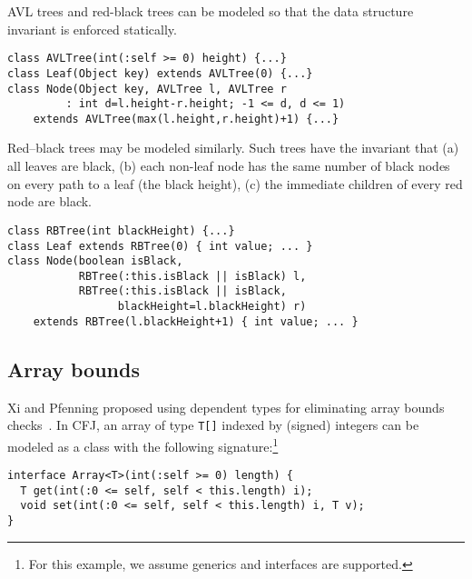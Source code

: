 AVL trees and red-black trees can be modeled so that the
data structure invariant is enforced statically.

{\footnotesize
\begin{verbatim}
class AVLTree(int(:self >= 0) height) {...}
class Leaf(Object key) extends AVLTree(0) {...}
class Node(Object key, AVLTree l, AVLTree r
         : int d=l.height-r.height; -1 <= d, d <= 1) 
    extends AVLTree(max(l.height,r.height)+1) {...}
\end{verbatim}}

Red--black trees may be modeled similarly. Such trees have the
invariant that (a) all leaves are black, (b) each non-leaf node has
the same number of black nodes on every path to a leaf (the black
height), (c) the immediate children of every red node are black.
{\footnotesize
\begin{verbatim}
class RBTree(int blackHeight) {...}
class Leaf extends RBTree(0) { int value; ... }
class Node(boolean isBlack, 
           RBTree(:this.isBlack || isBlack) l, 
           RBTree(:this.isBlack || isBlack,
                 blackHeight=l.blackHeight) r)
    extends RBTree(l.blackHeight+1) { int value; ... }
\end{verbatim}}


\subsection{Array bounds}

Xi and Pfenning proposed using dependent types for eliminating
array bounds checks~\cite{xi98array}.
In CFJ, an array of type {\tt T[]} indexed by (signed) integers
can be modeled as a class with the following
signature:\footnote{For this example, we assume generics and
interfaces are supported.}
{\footnotesize
\begin{verbatim}
interface Array<T>(int(:self >= 0) length) {
  T get(int(:0 <= self, self < this.length) i);
  void set(int(:0 <= self, self < this.length) i, T v);
}
\end{verbatim}}

